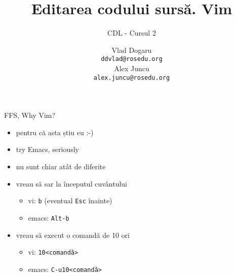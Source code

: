 \documentclass{beamer}
\title[]{Editarea codului surs\u{a}. Vim}
\subtitle{CDL - Cursul 2}
\institute[CDL 2011]{ROSEdu}
\author[]{Vlad Dogaru \\ \texttt{ddvlad@rosedu.org} \\ Alex Juncu \\
\texttt{alex.juncu@rosedu.org}}
\begin{document}
\maketitle

\tableofcontents

\begin{frame}{FFS, Why Vim?}
  \begin{itemize}
    \item pentru că asta știu eu :-)
    \pause
    \item try Emacs, seriously
    \pause
    \item nu sunt chiar atât de diferite
    \pause
    \item vreau să sar la începutul cuvântului
    \begin{itemize}
      \item vi: \texttt{b} (eventual \texttt{Esc} înainte)
      \item emacs: \texttt{Alt-b}
    \end{itemize}
    \item vreau să execut o comandă de 10 ori
    \begin{itemize}
      \item vi: \texttt{10<comandă>}
      \item emacs: \texttt{C-u10<comandă>}
    \end{itemize}
    \pause
  \end{itemize}
\end{frame}
\end{document}
